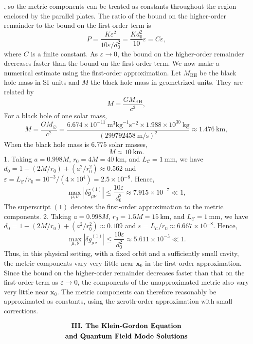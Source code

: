 \documentclass[english]{article}
\begin{document}
, so the metric components can be treated as constants throughout
the region enclosed by the parallel plates. The ratio of the bound
on the higher-order remainder to the bound on the first-order term
is 
\[
P=\frac{K\varepsilon^{2}}{10\varepsilon/d^{2}_{0}}=\frac{Kd^{2}_{0}}{10}\varepsilon=C\varepsilon,
\]
 where $C$ is a finite constant. As $\varepsilon\rightarrow0$, the
bound on the higher-order remainder decreases faster than the bound
on the first-order term. We now make a numerical estimate using the
first-order approximation. Let $M_{\text{BH}}$ be the black hole
mass in SI units and $M$ the black hole mass in geometrized units.
They are related by 
\[
M=\frac{GM_{\text{BH}}}{c^{2}},
\]
 For a black hole of one solar mass, 
\[
M=\frac{GM_{\odot}}{c^{2}}=\frac{6.674\times10^{-11}\ \text{m}^{3}\text{kg}^{-1}\text{s}^{-2}\times1.988\times10^{30}\ \text{kg}}{(299792458\ \text{m/s})^{2}}\approx1.476\ \text{km},
\]
 When the black hole mass is $6.775$ solar masses, 
\[
M\approx10\ \text{km}.
\]
 1. Taking $a=0.998M$, $r_{0}=4M=40\ \text{km}$, and $L_{\mathcal{C}}=1\ \text{mm}$,
we have $d_{0}=1-\left(2M/r_{0}\right)+\left(a^{2}/r^{2}_{0}\right)\approx0.562$
and $\varepsilon=L_{\mathcal{C}}/r_{0}=10^{-3}/\left(4\times10^{4}\right)=2.5\times10^{-8}$.
Hence, 
\[
\max_{\mu,\nu}|\delta\hat{g}^{(1)}_{\mu\nu}|\leq\frac{10\varepsilon}{d^{2}_{0}}\approx7.915\times10^{-7}\ll1,
\]
 The superscript $(1)$ denotes the first-order approximation to the
metric components. 2. Taking $a=0.998M$, $r_{0}=1.5M=15\ \text{km}$,
and $L_{\mathcal{C}}=1\ \text{mm}$, we have $d_{0}=1-\left(2M/r_{0}\right)+\left(a^{2}/r^{2}_{0}\right)\approx0.109$
and $\varepsilon=L_{\mathcal{C}}/r_{0}\approx6.667\times10^{-8}$.
Hence, 
\[
\max_{\mu,\nu}|\delta\hat{g}^{(1)}_{\mu\nu}|\leq\frac{10\varepsilon}{d^{2}_{0}}\approx5.611\times10^{-5}\ll1.
\]
 Thus, in this physical setting, with a fixed orbit and a sufficiently
small cavity, the metric components vary very little near $\boldsymbol{x}_{0}$
in the first-order approximation. Since the bound on the higher-order
remainder decreases faster than that on the first-order term as $\varepsilon\rightarrow0$,
the components of the unapproximated metric also vary very little
near $\boldsymbol{x}_{0}$. The metric components can therefore reasonably
be approximated as constants, using the zeroth-order approximation
with small corrections.

\Needspace{110pt}\par\addvspace{20pt}\noindent\begin{minipage}{\linewidth}\begingroup\fontsize{12}{15}\selectfont\setlength{\abovedisplayskip}{0pt}\setlength{\belowdisplayskip}{0pt}\setlength{\abovedisplayshortskip}{0pt}\setlength{\belowdisplayshortskip}{0pt}
\[
\begin{gathered}\text{\bfseries III. The Klein-Gordon Equation}\\
\text{\bfseries and Quantum Field Mode Solutions}
\end{gathered}
\]
\endgroup\end{minipage}\par\nopagebreak[4]\vspace{20pt}\nopagebreak[4]
\end{document}
